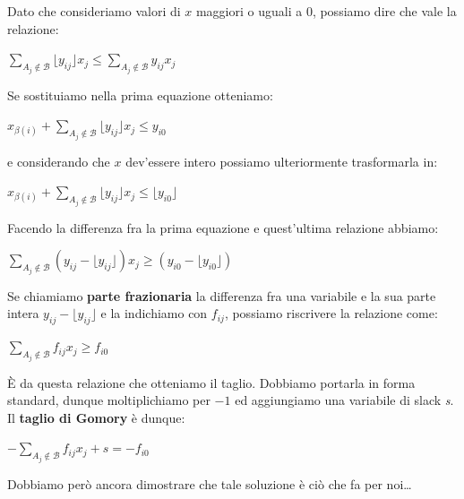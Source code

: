 \documentclass[11pt, oneside]{book}
\begin{document}
Dato che consideriamo valori di $x$ maggiori o uguali a 0, possiamo
dire che vale la relazione:

\begin{center}
$\sum\limits_{A_j \not\in \mathcal{B}} \lfloor y_{ij} \rfloor x_j \leq
  \sum\limits_{A_j \not\in \mathcal{B}} y_{ij}x_j$
\end{center}

Se sostituiamo nella prima equazione otteniamo:

\begin{center}
$x_{\beta(i)} + \sum\limits_{A_j \not\in \mathcal{B}} \lfloor y_{ij}
  \rfloor x_j \leq y_{i0}$  
\end{center}

e considerando che $x$ dev'essere intero possiamo ulteriormente
trasformarla in: 

\begin{center}
$x_{\beta(i)} + \sum\limits_{A_j \not\in \mathcal{B}} \lfloor y_{ij}
  \rfloor x_j \leq \lfloor y_{i0}\rfloor$  
\end{center}

Facendo la differenza fra la prima equazione e quest'ultima relazione
abbiamo:

\begin{center}
$\sum\limits_{A_j \not\in \mathcal{B}} (y_{ij} - \lfloor y_{ij}
  \rfloor) x_j \geq (y_{i0} - \lfloor y_{i0} \rfloor)$  
\end{center}

Se chiamiamo {\bf parte frazionaria} la differenza fra una variabile e
la sua parte intera $y_{ij} - \lfloor y_{ij} \rfloor$ e la indichiamo
con $f_{ij}$, possiamo riscrivere la relazione come:

\begin{center}
$\sum\limits_{A_j \not\in \mathcal{B}} f_{ij} x_j \geq f_{i0}$  
\end{center}

\`E da questa relazione che otteniamo il taglio. Dobbiamo portarla in
forma standard, dunque moltiplichiamo per $-1$ ed aggiungiamo una
variabile di slack {\em s}. Il {\bf taglio di Gomory} \`e dunque:

\begin{center}
$-\sum\limits_{A_j \not\in \mathcal{B}} f_{ij} x_j + s = -f_{i0}$  
\end{center}

Dobbiamo per\`o ancora dimostrare che tale soluzione \`e ci\`o che fa
per noi\dots

\par\bigskip
\end{document}

